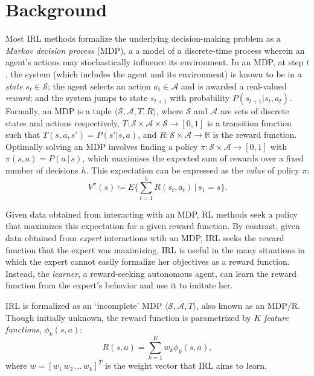 \documentclass[letterpaper]{article}
\begin{document}
\section{Background}
Most IRL methods formalize the underlying decision-making problem as a \emph{Markov decision process} (MDP), a a model of a discrete-time process wherein an agent's actions may stochastically influence its environment. In an MDP, at step $t$, the system (which includes the agent and its environment) is known to be in a \emph{state} $s_t\in\mathcal{S}$; the agent selects an action $a_t\in\mathcal{A}$ and is awarded a real-valued \emph{reward}; and the system jumps to state $s_{t+1}$ with probability $P(s_{t+1}|s_t,a_t)$. Formally, an MDP is a tuple $\langle\mathcal{S},\mathcal{A},T,R\rangle$, where $\mathcal{S}$ and $\mathcal{A}$ are sets of discrete states and actions respectively, $T:\mathcal{S}\times\mathcal{A}\times\mathcal{S}\rightarrow [0,1]$ is a transition function such that $T(s,a,s')=P(s'|s,a)$, and $R:\mathcal{S}\times\mathcal{A}\rightarrow\mathbb R$ is the reward function. 
Optimally solving an MDP involves finding a policy $\pi:\mathcal{S}\times\mathcal{A}\rightarrow[0,1]$ with $\pi(s,a) = P(a\,|\,s)$, which maximises the expected sum of rewards over a fixed number of decisions $h$. This expectation can be expressed as the \emph{value} of policy $\pi$:
\begin{equation}
\label{eq:value}
 V^\pi(s) \coloneqq E\{\sum_{t = 1}^hR(s_t,a_t)\,\vert\, s_1 = s\}.
\end{equation}

Given data obtained from interacting with an MDP, RL methods seek a policy that maximizes this expectation for a given reward function.  By contrast, given data obtained from \emph{expert} interactions wtih an MDP, IRL seeks the reward function that the expert was maximizing.  IRL is useful in the many situations in which the expert cannot easily formalize her objectives as a reward function.  Instead, the \emph{learner}, a reward-seeking autonomous agent, can learn the reward function from the expert's behavior and use it to imitate her.

IRL is formalized as an `incomplete' MDP $\langle\mathcal{S},\mathcal{A},T\rangle$, also known as an MDP/R. Though initially unknown, the reward function is parametrized by $K$ \emph{feature functions}, $\phi_k(s,a)$:
\begin{equation}
R(s,a) = \sum_{k=1}^Kw_k\phi_k(s,a), \label{eq:rew}
\end{equation}
where $w=[w_1\,w_2\,\ldots\,w_k]^T$ is the weight vector that IRL aims to learn.
\end{document}
